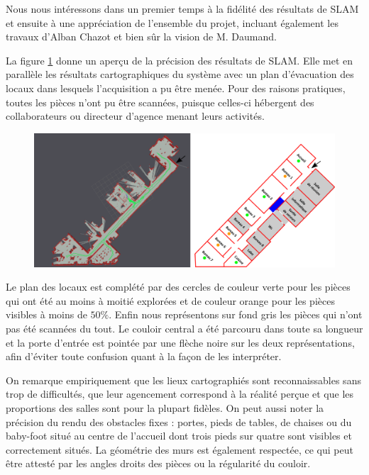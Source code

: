   Nous nous intéressons dans un premier temps à la fidélité des résultats de SLAM et ensuite à une appréciation de l'ensemble du projet, incluant également les travaux d'Alban Chazot et bien sûr la vision de M. Daumand.  
  
  La figure \ref{fig:carto} donne un aperçu de la précision des résultats de SLAM. 
  Elle met en parallèle les résultats cartographiques du système avec un plan d'évacuation des locaux dans lesquels l'acquisition a pu être menée. 
  Pour des raisons pratiques, toutes les pièces n'ont pu être scannées, puisque celles-ci hébergent des collaborateurs ou directeur d'agence menant leurs activités.
  
  \begin{figure}[h]
    \centering
      \includegraphics[width=1.\linewidth]{figures/plan}  
    \label{fig:carto}
  \end{figure}
  
  Le plan des locaux est complété par des cercles de couleur verte pour les pièces qui ont été au moins à moitié explorées et de couleur orange pour les pièces visibles à moins de $50\%$. 
  Enfin nous représentons sur fond gris les pièces qui n'ont pas été scannées du tout. 
  Le couloir central a été parcouru dans toute sa longueur et la porte d'entrée est pointée par une flèche noire sur les deux représentations, afin d'éviter toute confusion quant à la façon de les interpréter. 
  
  On remarque empiriquement que les lieux cartographiés sont reconnaissables sans trop de difficultés, que leur agencement correspond à la réalité perçue et que les proportions des salles sont pour la plupart fidèles. 
  On peut aussi noter la précision du rendu des obstacles fixes : portes, pieds de tables, de chaises ou du baby-foot situé au centre de l'accueil dont trois pieds sur quatre sont visibles et correctement situés. 
  La géométrie des murs est également respectée, ce qui peut être attesté par les angles droits des pièces ou la régularité du couloir. 
  
